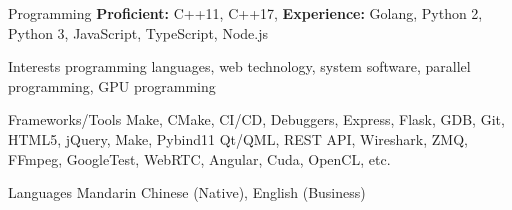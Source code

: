 
\begin{cvskills}
    \cvskill
    {Programming} %
    {
      \textbf{Proficient:} C++11, C++17, \textbf{Experience:} Golang, Python 2, Python 3, JavaScript,
      TypeScript, Node.js
    } %
    
    \cvskill
    {Interests} %
    {
      programming languages, web technology, system software,
      parallel programming, GPU programming
    } %

      \cvskill
      {Frameworks/Tools} %
      {
        Make, CMake, CI/CD, Debuggers, Express, Flask, GDB, Git, HTML5, jQuery, Make, Pybind11 \newline
        Qt/QML, REST API, Wireshark, ZMQ, FFmpeg, GoogleTest, WebRTC, Angular, Cuda, OpenCL, etc.
      } %

      \cvskill
        {Languages} %
        {Mandarin Chinese (Native), English (Business)} %
    
\end{cvskills}
